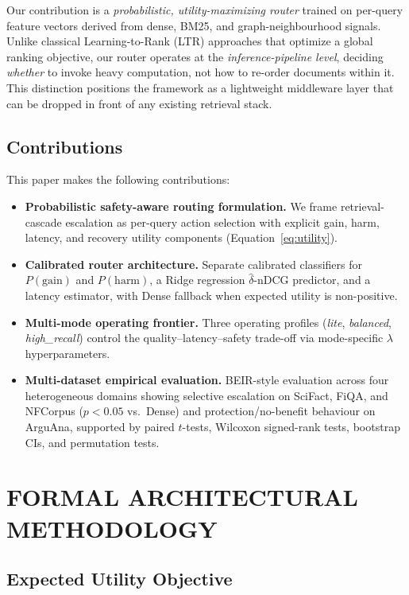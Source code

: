 \documentclass[journal]{IEEEtran}
\begin{document}
Our contribution is a \emph{probabilistic, utility-maximizing router}
trained on per-query feature vectors derived from dense, BM25, and
graph-neighbourhood signals. Unlike classical Learning-to-Rank
(LTR) approaches that optimize a global ranking objective, our
router operates at the \emph{inference-pipeline level}, deciding
\emph{whether} to invoke heavy computation, not how to re-order
documents within it. This distinction positions the framework as
a lightweight middleware layer that can be dropped in front of
any existing retrieval stack.

\subsection{Contributions}

This paper makes the following contributions:
\begin{itemize}
  \item \textbf{Probabilistic safety-aware routing formulation.}
        We frame retrieval-cascade escalation as per-query action
        selection with explicit gain, harm, latency, and recovery
        utility components (Equation~\ref{eq:utility}).
  \item \textbf{Calibrated router architecture.}
        Separate calibrated classifiers for $P(\text{gain})$ and
        $P(\text{harm})$, a Ridge regression $\hat{\delta}$-nDCG
        predictor, and a latency estimator, with Dense fallback
        when expected utility is non-positive.
  \item \textbf{Multi-mode operating frontier.}
        Three operating profiles (\textit{lite}, \textit{balanced},
        \textit{high\_recall}) control the quality--latency--safety
        trade-off via mode-specific $\lambda$ hyperparameters.
  \item \textbf{Multi-dataset empirical evaluation.}
        BEIR-style evaluation across four heterogeneous domains
        showing selective escalation on SciFact, FiQA, and NFCorpus
        ($p < 0.05$ vs.\ Dense) and protection/no-benefit behaviour
        on ArguAna, supported by paired $t$-tests, Wilcoxon
        signed-rank tests, bootstrap CIs, and permutation tests.
\end{itemize}

\section{FORMAL ARCHITECTURAL METHODOLOGY}
\label{sec:method}
\subsection{Expected Utility Objective}
\label{sec:utility}
\end{document}
